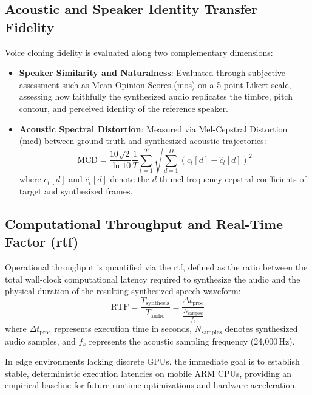 \subsection{Acoustic and Speaker Identity Transfer Fidelity}
Voice cloning fidelity is evaluated along two complementary dimensions:
\begin{itemize}[leftmargin=*]
    \item \textbf{Speaker Similarity and Naturalness}: Evaluated through subjective assessment such as Mean Opinion Scores (\acrshort{mos}) on a 5-point Likert scale, assessing how faithfully the synthesized audio replicates the timbre, pitch contour, and perceived identity of the reference speaker.
    \item \textbf{Acoustic Spectral Distortion}: Measured via Mel-Cepstral Distortion (\acrshort{mcd}) between ground-truth and synthesized acoustic trajectories:
    \begin{equation}
        \text{MCD} = \frac{10\sqrt{2}}{\ln 10} \frac{1}{T} \sum_{t=1}^T \sqrt{\sum_{d=1}^D (c_t[d] - \hat{c}_t[d])^2}
    \end{equation}
    where $c_t[d]$ and $\hat{c}_t[d]$ denote the $d$-th mel-frequency cepstral coefficients of target and synthesized frames.
\end{itemize}

\subsection[Computational Throughput and RTF]{Computational Throughput and Real-Time Factor (\acrshort{rtf})}
Operational throughput is quantified via the \acrshort{rtf}, defined as the ratio between the total wall-clock computational latency required to synthesize the audio and the physical duration of the resulting synthesized speech waveform:
\begin{equation}
    \text{RTF} = \frac{T_{\text{synthesis}}}{T_{\text{audio}}} = \frac{\Delta t_{\text{proc}}}{\frac{N_{\text{samples}}}{f_s}}
    \label{eq:rtf_definition}
\end{equation}
where $\Delta t_{\text{proc}}$ represents execution time in seconds, $N_{\text{samples}}$ denotes synthesized audio samples, and $f_s$ represents the acoustic sampling frequency (24,000\,Hz).

In edge environments lacking discrete GPUs, the immediate goal is to establish stable, deterministic execution latencies on mobile ARM CPUs, providing an empirical baseline for future runtime optimizations and hardware acceleration.

